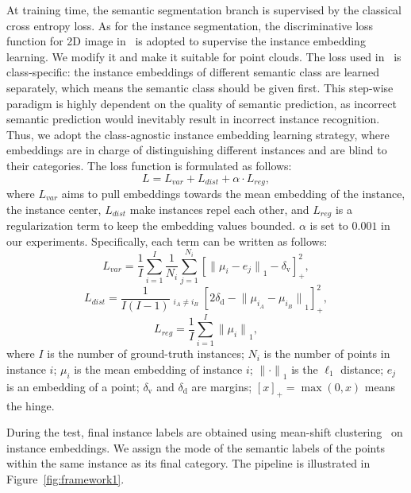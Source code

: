 \documentclass[10pt,twocolumn,letterpaper]{article}
\begin{document}
At training time, the semantic segmentation branch is supervised by the classical cross entropy loss. 
As for the instance segmentation, the discriminative loss function for 2D image in~\cite{de2017semantic} is adopted to supervise the instance embedding learning.
We modify it and make it suitable for point clouds.
The loss used in~\cite{de2017semantic} is class-specific: the instance embeddings of different semantic class are learned separately, which means the semantic class should be given first.
This step-wise paradigm is highly dependent on the quality of semantic prediction, as incorrect semantic prediction would inevitably result in incorrect instance recognition.
Thus, we adopt the class-agnostic instance embedding learning strategy, where embeddings are in charge of distinguishing different instances and are blind to their categories. The loss function is formulated as follows:
\begin{equation}
L =  L_{var} + L_{dist} + \alpha \cdot L_{reg},
\end{equation}
where $L_{var}$ aims to pull embeddings towards the mean embedding of the instance, \ie the instance center, 
$L_{dist}$ make instances repel each other, and $L_{reg}$ is a regularization term to keep the embedding values bounded. $\alpha$ is set to $0.001$ in our experiments. Specifically, each term can be written as follows:
\begin{equation}
	L_{var} = \frac{1}{I} \sum_{i=1}^{I} \frac{1}{N_i} \sum_{j=1}^{N_i} \left[ {\lVert \mu_i - e_j \rVert}_1 - \delta_{\textrm{v}} \right]_{+}^2,
\label{eq:l_var}
\end{equation}
\begin{equation}
L_{dist} = \frac{1}{I (I-1)} \mathop{\sum_{i_A = 1}^{I} \sum_{i_B = 1}^{I}}_{i_A \neq i_B} \left[ 2 \delta_{\textrm{d}} - {\lVert \mu_{i_A} - \mu_{i_B} \rVert}_1 \right]_{+}^2,
\end{equation}
\begin{equation}
L_{reg} = \frac{1}{I} \sum_{i=1}^{I} {\lVert \mu_{i} \rVert}_1,
\end{equation}
where $I$ is the number of ground-truth instances; $N_i$ is the number of points in instance $i$;
$\mu_i$ is the mean embedding of instance $i$;
${\lVert \cdot \rVert}_1$ is the $\ell_1$ distance;
$e_j$ is an embedding of a point;
$\delta_{\textrm{v}}$ and $\delta_{\textrm{d}}$ are margins;
$[x]_{+} = \max (0, x)$ means the hinge. 


During the test, 
final instance labels are obtained using mean-shift clustering~\cite{comaniciu2002mean} on instance embeddings.
We assign the mode of the semantic labels of the points within the same instance as its final category. The pipeline is illustrated in Figure~\ref{fig:framework1}.
\end{document}
